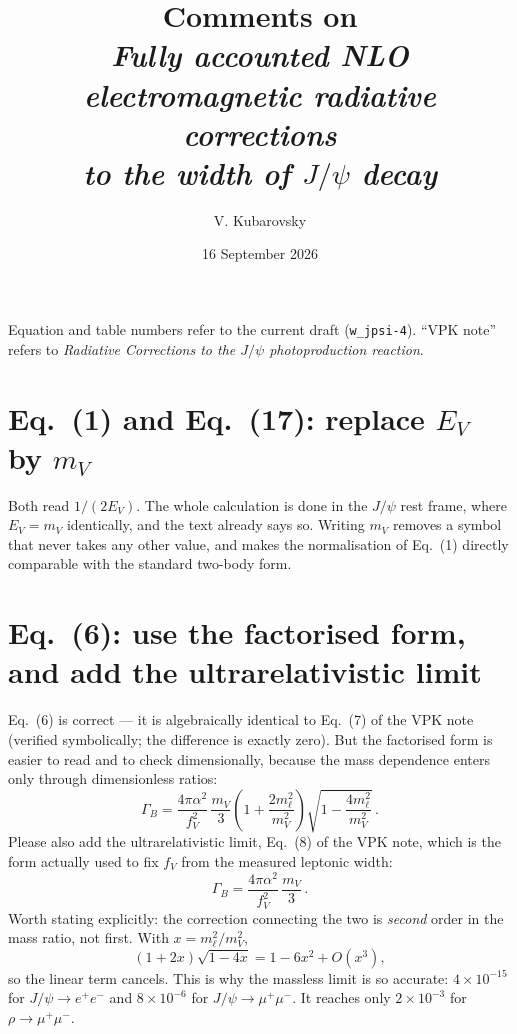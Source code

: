\documentclass[11pt]{article}
\title{\vspace{-2em}Comments on\\[0.3em]
\emph{Fully accounted NLO electromagnetic radiative corrections\\
to the width of $J/\psi$ decay}}
\author{V. Kubarovsky}
\date{16 September 2026}
\begin{document}
\maketitle

\noindent
Equation and table numbers refer to the current draft (\texttt{w\_jpsi-4}).
``VPK note'' refers to \emph{Radiative Corrections to the $J/\psi$
photoproduction reaction}.

\section{Eq.~(1) and Eq.~(17): replace $E_V$ by $m_V$}

Both read $1/(2E_V)$. The whole calculation is done in the $J/\psi$ rest frame,
where $E_V=m_V$ identically, and the text already says so. Writing $m_V$ removes
a symbol that never takes any other value, and makes the normalisation of
Eq.~(1) directly comparable with the standard two-body form.

\section{Eq.~(6): use the factorised form, and add the ultrarelativistic limit}

Eq.~(6) is correct --- it is algebraically identical to Eq.~(7) of the VPK note
(verified symbolically; the difference is exactly zero). But the factorised form
is easier to read and to check dimensionally, because the mass dependence enters
only through dimensionless ratios:
\begin{equation*}
\Gamma_B=\frac{4\pi\alpha^{2}}{f_V^{2}}\,\frac{m_V}{3}
\left(1+\frac{2m_\ell^{2}}{m_V^{2}}\right)
\sqrt{1-\frac{4m_\ell^{2}}{m_V^{2}}}\,.
\end{equation*}
Please also add the ultrarelativistic limit, Eq.~(8) of the VPK note, which is
the form actually used to fix $f_V$ from the measured leptonic width:
\begin{equation*}
\Gamma_B=\frac{4\pi\alpha^{2}}{f_V^{2}}\,\frac{m_V}{3}\,.
\end{equation*}
Worth stating explicitly: the correction connecting the two is \emph{second}
order in the mass ratio, not first. With $x=m_\ell^{2}/m_V^{2}$,
\begin{equation*}
(1+2x)\sqrt{1-4x}=1-6x^{2}+O(x^{3}),
\end{equation*}
so the linear term cancels. This is why the massless limit is so accurate:
$4\times10^{-15}$ for $J/\psi\to e^+e^-$ and $8\times10^{-6}$ for
$J/\psi\to\mu^+\mu^-$. It reaches only $2\times10^{-3}$ for $\rho\to\mu^+\mu^-$.
\end{document}
